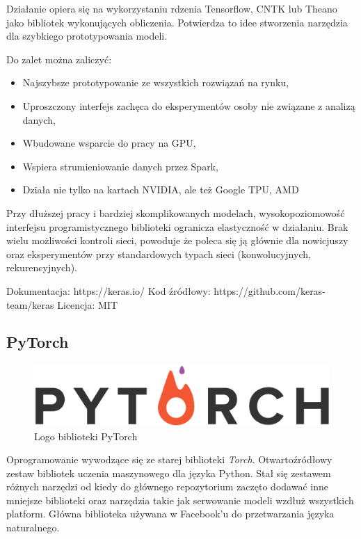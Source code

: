 \documentclass[12pt,a4paper,twoside,titlepage,openright]{book}
\begin{document}
Działanie opiera się na wykorzystaniu rdzenia Tensorflow, CNTK lub Theano jako bibliotek wykonujących obliczenia. Potwierdza to idee stworzenia narzędzia dla szybkiego prototypowania modeli.\cite{bookDeepLearningKeras}

Do zalet można zaliczyć:
\begin{itemize}
\item Najszybsze prototypowanie ze wszystkich rozwiązań na rynku,
\item Uproszczony interfejs zachęca do eksperymentów osoby nie związane z analizą danych,
\item Wbudowane wsparcie do pracy na GPU,
\item Wspiera strumieniowanie danych przez Spark,
\item Działa nie tylko na kartach NVIDIA, ale też Google TPU, AMD
\end{itemize}

Przy dłuższej pracy i bardziej skomplikowanych modelach, wysokopoziomowość interfejsu programistycznego biblioteki ogranicza elastyczność w działaniu. Brak wielu możliwości kontroli sieci, powoduje że poleca się ją głównie dla nowicjuszy oraz eksperymentów przy standardowych typach sieci (konwolucyjnych, rekurencyjnych).

\noindent
\newline 
Dokumentacja: https://keras.io/
\newline 
Kod źródłowy: https://github.com/keras-team/keras
\newline 
Licencja: MIT

\subsection{PyTorch}
\begin{figure}[ht]
	\centering
			\includegraphics[resolution=100, scale=0.5]{PyTorch.png}
		\caption{Logo biblioteki PyTorch}
\end{figure}

Oprogramowanie wywodzące się ze starej biblioteki \textit{Torch}. Otwartoźródłowy zestaw bibliotek uczenia maszynowego dla języka Python. Stał się zestawem różnych narzędzi od kiedy do głównego repozytorium zaczęto dodawać inne mniejsze biblioteki oraz narzędzia takie jak serwowanie modeli wzdłuż wszystkich platform. Główna biblioteka używana w Facebook'u do przetwarzania języka naturalnego. 
\end{document}
